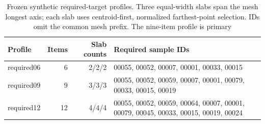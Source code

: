 \begin{table}[t]
  \centering
  \caption{Frozen synthetic required-target profiles. Three equal-width slabs span the mesh longest axis; each slab uses centroid-first, normalized farthest-point selection. IDs omit the common mesh prefix. The nine-item profile is primary}
  \label{tab:required-profiles}
  \renewcommand{\arraystretch}{1.08}
  \setlength{\tabcolsep}{5pt}
  \footnotesize
  \begin{tabular}{@{}lrrl@{}}
    \toprule
    Profile & Items & Slab counts & Required sample IDs \\
    \midrule
    required06 & 6 & 2/2/2 & 00055, 00052, 00007, 00001, 00033, 00015 \\
    required09 & 9 & 3/3/3 & 00055, 00052, 00059, 00007, 00001, 00079, 00033, 00015, 00019 \\
    required12 & 12 & 4/4/4 & 00055, 00052, 00059, 00064, 00007, 00001, 00079, 00045, 00033, 00015, 00019, 00024 \\
    \bottomrule
  \end{tabular}
\end{table}
